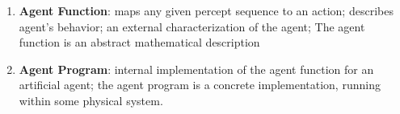 \begin{enumerate}[itemsep=0.2cm]
    \item \textbf{Agent Function}: maps any given percept sequence to an action; describes agent’s behavior; an external characterization of the agent; The agent function is an abstract mathematical description
    \hfill \cite{ai/book/Artificial-Intelligence-A-Modern-Approach/Russell-Norvig}

    \item \textbf{Agent Program}: internal implementation of the agent function for an artificial agent; the agent program is a concrete implementation, running within some physical system.
    \hfill \cite{ai/book/Artificial-Intelligence-A-Modern-Approach/Russell-Norvig}
\end{enumerate}

